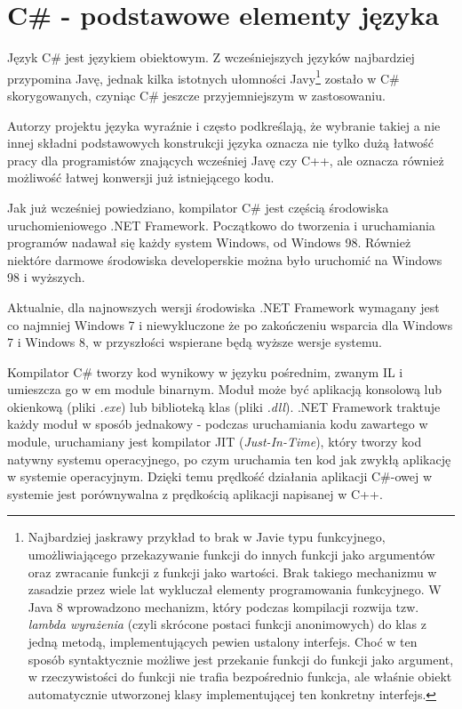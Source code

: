 ﻿\section{C\# - podstawowe elementy języka}

Język C\# jest językiem obiektowym. Z wcześniejszych języków najbardziej przypomina Javę, jednak
kilka istotnych ułomności Javy\footnote{Najbardziej jaskrawy przykład to brak w Javie typu funkcyjnego, 
umożliwiającego przekazywanie
funkcji do innych funkcji jako argumentów oraz zwracanie funkcji z funkcji jako wartości. Brak takiego mechanizmu
w zasadzie przez wiele lat wykluczał elementy programowania funkcyjnego. W Java 8 wprowadzono mechanizm, który
podczas kompilacji rozwija tzw. {\em lambda wyrażenia} (czyli skrócone postaci funkcji anonimowych) do 
klas z jedną metodą, implementujących pewien ustalony interfejs. Choć w ten sposób syntaktycznie możliwe jest przekanie
funkcji do funkcji jako argument, w rzeczywistości do funkcji nie trafia bezpośrednio funkcja, ale właśnie
obiekt automatycznie utworzonej klasy implementującej ten konkretny interfejs.} 
zostało w C\# skorygowanych, czyniąc C\# jeszcze przyjemniejszym w zastosowaniu.

Autorzy projektu języka wyraźnie i często podkreślają, że wybranie takiej a nie innej składni 
podstawowych konstrukcji języka oznacza nie tylko dużą łatwość pracy dla programistów znających 
wcześniej Javę czy C++, ale oznacza również możliwość łatwej konwersji już istniejącego 
kodu.

Jak już wcześniej powiedziano, kompilator C\# jest częścią środowiska uruchomieniowego .NET Framework. 
Początkowo do tworzenia i uruchamiania programów nadawał się każdy system Windows, od Windows 98. Również
niektóre darmowe środowiska developerskie można było uruchomić na Windows 98 i wyższych. 

Aktualnie, dla najnowszych wersji środowiska .NET Framework wymagany jest co najmniej Windows 7 i niewykluczone
że po zakończeniu wsparcia dla Windows 7 i Windows 8, w przyszłości wspierane będą wyższe wersje systemu.

Kompilator C\# tworzy kod wynikowy w języku pośrednim, zwanym IL i umieszcza go
w {em module binarnym}. Moduł może być aplikacją konsolową lub okienkową (pliki {\em *.exe}) lub
biblioteką klas (pliki {\em *.dll}). .NET Framework traktuje każdy moduł w sposób jednakowy - podczas
uruchamiania kodu zawartego w module, uruchamiany jest kompilator JIT ({\em Just-In-Time}), który 
tworzy kod natywny systemu operacyjnego, po czym uruchamia ten kod jak zwykłą aplikację w systemie
operacyjnym. Dzięki temu prędkość działania aplikacji C\#-owej w systemie jest porównywalna
z prędkością aplikacji napisanej w C++. 

